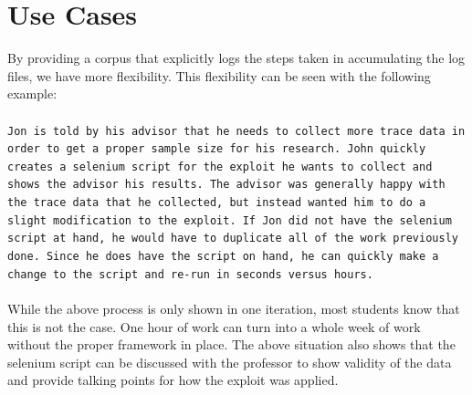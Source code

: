 \documentclass[letterpaper,twocolumn,10pt]{article}
\begin{document}
\section{Use Cases}
By providing a corpus that explicitly logs the steps taken in accumulating the log files, we have more flexibility.  This flexibility can be seen with the following example:  
\\\\
{\tt Jon is told by his advisor that he needs to collect more trace data in order to get a proper sample size for his research.  John quickly creates a selenium script for the exploit he wants to collect and shows the advisor his results.  The advisor was generally happy with the trace data that he collected, but instead wanted him to do a slight modification to the exploit.  If Jon did not have the selenium script at hand, he would have to duplicate all of the work previously done.  Since he does have the script on hand, he can quickly make a change to the script and re-run in seconds versus hours.}
\\\\
While the above process is only shown in one iteration, most students know that this is not the case.  One hour of work can turn into a whole week of work without the proper framework in place.  The above situation also shows that the selenium script can be discussed with the professor to show validity of the data and provide talking points for how the exploit was applied.
\end{document}

